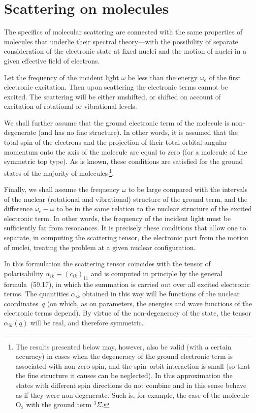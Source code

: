 \section{Scattering on molecules}

The specifics of molecular scattering are connected with the same properties of molecules that underlie their spectral theory---with the possibility of separate consideration of the electronic state at fixed nuclei and the motion of nuclei in a given effective field of electrons.

Let the frequency of the incident light $\omega$ be less than the energy $\omega_e$ of the first electronic excitation. Then upon scattering the electronic terms cannot be excited. The scattering will be either unshifted, or shifted on account of excitation of rotational or vibrational levels.

We shall further assume that the ground electronic term of the molecule is non-degenerate (and has no fine structure). In other words, it is assumed that the total spin of the electrons and the projection of their total orbital angular momentum onto the axis of the molecule are equal to zero (for a molecule of the symmetric top type). As is known, these conditions are satisfied for the ground states of the majority of molecules\,\footnote{The results presented below may, however, also be valid (with a certain accuracy) in cases when the degeneracy of the ground electronic term is associated with non-zero spin, and the spin--orbit interaction is small (so that the fine structure it causes can be neglected). In this approximation the states with different spin directions do not combine and in this sense behave as if they were non-degenerate. Such is, for example, the case of the molecule $\mathrm{O}_2$ with the ground term $^3\Sigma$.}.

Finally, we shall assume the frequency $\omega$ to be large compared with the intervals of the nuclear (rotational and vibrational) structure of the ground term, and the difference $\omega_e - \omega$ to be in the same relation to the nuclear structure of the excited electronic term. In other words, the frequency of the incident light must be sufficiently far from resonances. It is precisely these conditions that allow one to separate, in computing the scattering tensor, the electronic part from the motion of nuclei, treating the problem at a given nuclear configuration.

In this formulation the scattering tensor coincides with the tensor of polarisability $\alpha_{ik} \equiv (c_{ik})_{11}$ and is computed in principle by the general formula~(59.17), in which the summation is carried out over all excited electronic terms. The quantities $\alpha_{ik}$ obtained in this way will be functions of the nuclear coordinates~$q$ (on which, as on parameters, the energies and wave functions of the electronic terms depend). By virtue of the non-degeneracy of the state, the tensor $\alpha_{ik}(q)$ will be real, and therefore symmetric.

